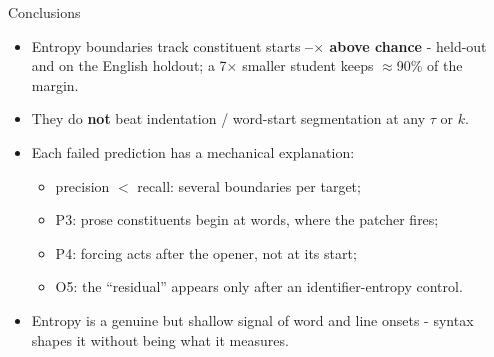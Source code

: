 \documentclass[aspectratio=169,11pt]{beamer}
\newcommand{\hl}[1]{\textcolor{acc}{\textbf{#1}}}
\begin{document}
\begin{frame}{Conclusions}
\begin{itemize}
\item Entropy boundaries track constituent starts \hl{\xRatioEn{}--\xRatioPy{}$\times$ above chance} - held-out and on the English holdout; a 7$\times$ smaller student keeps $\approx$90\% of the margin.
\item They do \hl{not} beat indentation / word-start segmentation at any $\tau$ or $k$.
\item Each failed prediction has a mechanical explanation:
  \begin{itemize}
  \item precision $<$ recall: several boundaries per target;
  \item P3: prose constituents begin at words, where the patcher fires;
  \item P4: forcing acts after the opener, not at its start;
  \item O5: the ``residual'' appears only after an identifier-entropy control.
  \end{itemize}
\item Entropy is a genuine but shallow signal of word and line onsets - syntax shapes it without being what it measures.
\end{itemize}
\end{frame}
\end{document}
